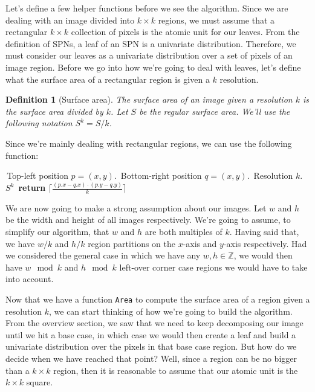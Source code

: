 \documentclass{amsart}
\theoremstyle{plain}
\newcounter{dummy-def}\numberwithin{dummy-def}{section}
\newtheorem{definition}[dummy-def]{Definition}
\newcounter{dummy-thm}\numberwithin{dummy-thm}{section}
\newcounter{dummy-prop}\numberwithin{dummy-prop}{section}
\newcounter{dummy-corollary}\numberwithin{dummy-corollary}{section}
\newcounter{dummy-lemma}\numberwithin{dummy-lemma}{section}
\newcounter{dummy-ex}\numberwithin{dummy-ex}{section}
\newcounter{dummy-eg}\numberwithin{dummy-eg}{section}
\numberwithin{equation}{section}
\newcommand{\mcode}[1]{\lstinline[mathescape]!#1!}
\begin{document}
Let's define a few helper functions before we see the algorithm. Since we are dealing with an image
divided into $k\times k$ regions, we must assume that a rectangular $k\times k$ collection of
pixels is the atomic unit for our leaves. From the definition of SPNs, a leaf of an SPN is a
univariate distribution. Therefore, we must consider our leaves as a univariate distribution over
a set of pixels of an image region. Before we go into how we're going to deal with leaves, let's
define what the surface area of a rectangular region is given a $k$ resolution.

\begin{definition}[Surface area] The surface area of an image given a resolution $k$ is the surface
  area divided by $k$. Let $S$ be the regular surface area. We'll use the following notation
  $S^k = S/k$.
\end{definition}

Since we're mainly dealing with rectangular regions, we can use the following function:

\begin{algorithm}[H]
  \caption{\mcode{Area$(p, q, k)$}}\label{alg:area}
  \begin{algorithmic}[1]
    \Require\,Top-left position $p = (x, y)$.
    \Require\,Bottom-right position $q = (x, y)$.
    \Require\,Resolution $k$.
    \Ensure\,$S^k$
    \State\,\textbf{return} $\lceil\frac{(p.x - q.x)\cdot (p.y - q.y)}{k}\rceil$
  \end{algorithmic}
\end{algorithm}

We are now going to make a strong assumption about our images. Let $w$ and $h$ be the width and
height of all images respectively. We're going to assume, to simplify our algorithm, that $w$ and
$h$ are both multiples of $k$. Having said that, we have $w/k$ and $h/k$ region partitions on the
$x$-axis and $y$-axis respectively. Had we considered the general case in which we have any $w,h\in
\mathbb{Z}$, we would then have $w \mod k$ and $h \mod k$ left-over corner case regions we would
have to take into account.

Now that we have a function \mcode{Area} to compute the surface area of a region given a resolution
$k$, we can start thinking of how we're going to build the algorithm. From the overview section, we
saw that we need to keep decomposing our image until we hit a base case, in which case we would
then create a leaf and build a univariate distribution over the pixels in that base case region.
But how do we decide when we have reached that point? Well, since a region can be no bigger than a
$k\times k$ region, then it is reasonable to assume that our atomic unit is the $k\times k$ square.
\end{document}
